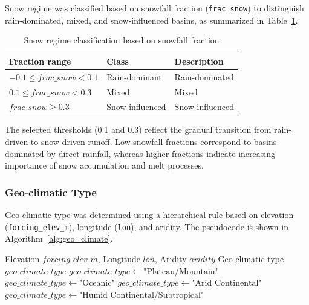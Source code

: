 \documentclass[11pt]{article}
\begin{document}
Snow regime was classified based on snowfall fraction (\texttt{frac\_snow}) to distinguish rain-dominated, mixed, and snow-influenced basins, as summarized in Table~\ref{tab:snow_regime}\cite{Berghuijs2014}.

\begin{table}[htbp]
    \centering
    \caption{Snow regime classification based on snowfall fraction}
    \label{tab:snow_regime}
    \begin{tabular*}{\textwidth}{@{\extracolsep{\fill}}lll}
        \toprule
        \textbf{Fraction range} & \textbf{Class} & \textbf{Description} \\
        \midrule
        $-0.1 \le frac\_snow < 0.1$ & Rain-dominant & Rain-dominated \\
        $0.1 \le frac\_snow < 0.3$ & Mixed & Mixed \\
        $frac\_snow \ge 0.3$ & Snow-influenced & Snow-influenced \\
        \bottomrule
    \end{tabular*}
\end{table}

The selected thresholds (0.1 and 0.3) reflect the gradual transition from rain-driven to snow-driven runoff. Low snowfall fractions correspond to basins dominated by direct rainfall, whereas higher fractions indicate increasing importance of snow accumulation and melt processes\cite{Biemans2019}.

\subsubsection*{Geo-climatic Type}

Geo-climatic type was determined using a hierarchical rule based on elevation (\texttt{forcing\_elev\_m}), longitude (\texttt{lon}), and aridity\cite{hess-24-1081-2020}. The pseudocode is shown in Algorithm~\ref{alg:geo_climate}.

\begin{algorithm}[htbp]
    \caption{Hierarchical classification for geo-climatic type}
    \label{alg:geo_climate}
    \begin{algorithmic}[1]
        \Require Elevation $forcing\_elev\_m$, Longitude $lon$, Aridity $aridity$
        \Ensure Geo-climatic type $geo\_climate\_type$
        \State $geo\_climate\_type \gets \text{"Plateau/Mountain"}$
        \State $geo\_climate\_type \gets \text{"Oceanic"}$
        \State $geo\_climate\_type \gets \text{"Arid Continental"}$
        \Else
        \State $geo\_climate\_type \gets \text{"Humid Continental/Subtropical"}$
        \EndIf
    \end{algorithmic}
\end{algorithm}
\end{document}
